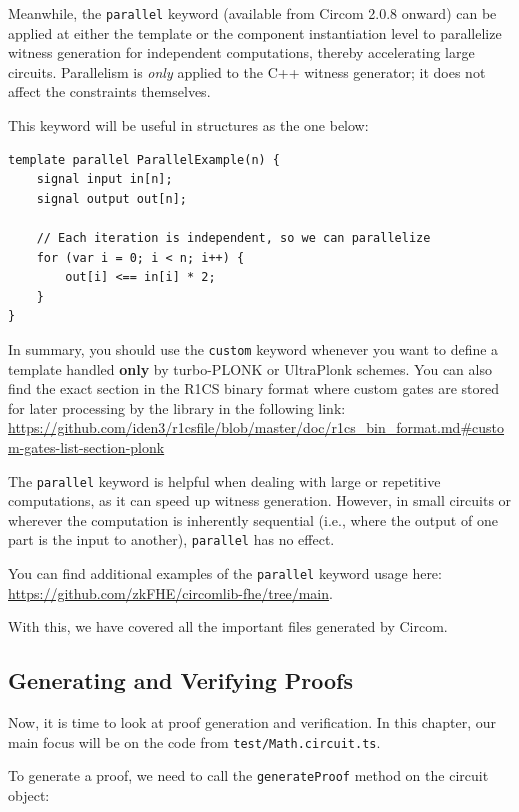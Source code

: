 \documentclass[../../book.tex]{subfiles}
\begin{document}
Meanwhile, the \texttt{parallel} keyword (available from Circom 2.0.8 onward) can be applied at either the template or
the component instantiation level to parallelize witness generation for independent computations, thereby accelerating large circuits.
Parallelism is \emph{only} applied to the C++ witness generator; it does not affect the constraints themselves.

This keyword will be useful in structures as the one below:

\begin{lstlisting}[language=Circom,basicstyle=\ttfamily\footnotesize]
template parallel ParallelExample(n) {
    signal input in[n];
    signal output out[n];

    // Each iteration is independent, so we can parallelize
    for (var i = 0; i < n; i++) {
        out[i] <== in[i] * 2;
    }
}
\end{lstlisting}

In summary, you should use the \texttt{custom} keyword whenever you want to define a template handled \textbf{only} by turbo-PLONK or UltraPlonk schemes.
You can also find the exact section in the R1CS binary format where custom gates are stored for later processing by the library in the following link: \\
\url{https://github.com/iden3/r1csfile/blob/master/doc/r1cs_bin_format.md\#custom-gates-list-section-plonk}

The \texttt{parallel} keyword is helpful when dealing with large or repetitive computations, as it can speed up witness generation.
However, in small circuits or wherever the computation is inherently sequential (i.e., where the output of one part is the input to another), \texttt{parallel} has no effect.

You can find additional examples of the \texttt{parallel} keyword usage here: \url{https://github.com/zkFHE/circomlib-fhe/tree/main}.

With this, we have covered all the important files generated by Circom.

\subsection{Generating and Verifying Proofs}

Now, it is time to look at proof generation and verification.
In this chapter, our main focus will be on the code from \texttt{test/Math.circuit.ts}.

To generate a proof, we need to call the \texttt{generateProof} method on the circuit object:
\end{document}

